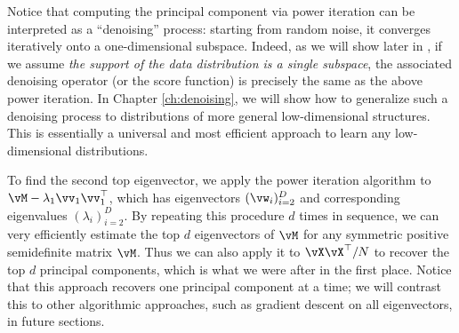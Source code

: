 \documentclass[../../book-main.tex]{subfiles}
\begin{document}
\begin{remark} Notice that
    computing the principal component via power iteration can be
    interpreted as a ``denoising'' process: starting from random
    noise, it converges iteratively onto a one-dimensional subspace.
    Indeed, as we will show later in , if we
    assume {\em the support of the data distribution is a single
    subspace}, the associated denoising operator (or the score
    function) is precisely the same as the above power iteration. In
    Chapter \ref{ch:denoising}, we will show how to generalize such a
    denoising process to distributions of more general
    low-dimensional structures. This is essentially a universal and
    most efficient approach to learn any low-dimensional distributions.
\end{remark}

To find the second top eigenvector, we apply the power iteration
algorithm to \(\vM - \lambda_{1}\vv_{1}\vv_{1}^{\top}\), which has
eigenvectors \((\vw_{i})_{i = 2}^{D}\) and corresponding eigenvalues
\((\lambda_{i})_{i = 2}^{D}\). By repeating this procedure \(d\)
times in sequence, we can very efficiently estimate the top \(d\)
eigenvectors of \(\vM\) for any symmetric positive semidefinite
matrix \(\vM\). Thus we can also apply it to \(\vX\vX^{\top}/N\) to
recover the top \(d\) principal components, which is what we were
after in the first place. Notice that this approach recovers one
principal component at a time; we will contrast this to other
algorithmic approaches, such as gradient descent on all eigenvectors,
in future sections.

%
\end{document}

